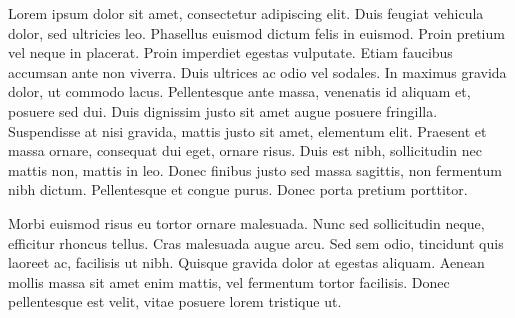 \documentclass[a4paper,11pt]{article}
\begin{document}
\begin{mlsolution}
 Lorem ipsum dolor sit amet, consectetur adipiscing elit. Duis feugiat vehicula dolor, sed ultricies leo. Phasellus euismod dictum felis in euismod. Proin pretium vel neque in placerat. Proin imperdiet egestas vulputate. Etiam faucibus accumsan ante non viverra. Duis ultrices ac odio vel sodales. In maximus gravida dolor, ut commodo lacus. Pellentesque ante massa, venenatis id aliquam et, posuere sed dui. Duis dignissim justo sit amet augue posuere fringilla. Suspendisse at nisi gravida, mattis justo sit amet, elementum elit. Praesent et massa ornare, consequat dui eget, ornare risus. Duis est nibh, sollicitudin nec mattis non, mattis in leo. Donec finibus justo sed massa sagittis, non fermentum nibh dictum. Pellentesque et congue purus. Donec porta pretium porttitor.

Morbi euismod risus eu tortor ornare malesuada. Nunc sed sollicitudin neque, efficitur rhoncus tellus. Cras malesuada augue arcu. Sed sem odio, tincidunt quis laoreet ac, facilisis ut nibh. Quisque gravida dolor at egestas aliquam. Aenean mollis massa sit amet enim mattis, vel fermentum tortor facilisis. Donec pellentesque est velit, vitae posuere lorem tristique ut. 
\end{mlsolution}
					
\end{document}
